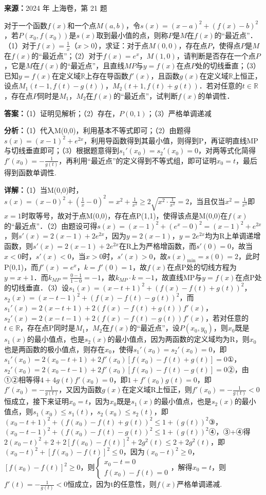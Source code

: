 \begin{question}[points=18]
\textbf{来源：}2024 年 上海卷，第 21 题\par
对于一个函数$f(x)$和一个点$M(a,b)$，令$s(x)=(x-a)^2+(f(x)-b)^2$，若$P(x_0,f(x_0))$是$s(x)$取到最小值的点，则称$P$是$M$在$f(x)$的“最近点”．（1）对于$f(x)=\frac1x$（$x>0$），求证：对于点$M(0,0)$，存在点$P$，使得点$P$是$M$在$f(x)$的“最近点”；（2）对于$f(x)=e^x$，$M(1,0)$，请判断是否存在一个点$P$，它是$M$在$f(x)$的“最近点”，且直线$MP$与$y=f(x)$在点$P$处的切线垂直；（3）已知$y=f(x)$在定义域$\mathbb{R}$上存在导函数$f'(x)$，且函数$g(x)$在定义域$\mathbb{R}$上恒正，设点$M_1(t-1,f(t)-g(t))$，$M_2(t+1,f(t)+g(t))$．若对任意的$t\in\mathbb{R}$，存在点$P$同时是$M_1$，$M_2$在$f(x)$的“最近点”，试判断$f(x)$的单调性．
\begin{solution}
\textbf{答案：}（1）证明见解析；（2）存在，$P(0,1)$；（3）严格单调递减

\textbf{分析：}（1）代入M(0,0)，利用基本不等式即可；（2）由题得$s(x)=(x-1)^2+e^{2x}$，利用导函数得到其最小值，则得到P，再证明直线MP与切线垂直即可；（3）根据题意得到$s_1'(x_0)=s_2'(x_0)=0$，对两等式化简得$f'(x_0)=-\frac1{g(t)}$，再利用“最近点”的定义得到不等式组，即可证明$x_0=t$，最后得到函数单调性.

\textbf{详解：}（1）当M(0,0)时，$s(x)=(x-0)^2+(\frac1x-0)^2=x^2+\frac1{x^2}\ge2\sqrt{x^2\cdot\frac1{x^2}}=2$，当且仅当$x^2=\frac1{x^2}$即$x=1$时取等号，故对于点M(0,0)，存在点P(1,1)，使得该点是M(0,0)在$f(x)$的“最近点”．（2）由题设可得$s(x)=(x-1)^2+(e^x-0)^2=(x-1)^2+e^{2x}$，则$s'(x)=2(x-1)+2e^{2x}$，因为$y=2(x-1)$，$y=2e^{2x}$均为R上单调递增函数，则$s'(x)=2(x-1)+2e^{2x}$在R上为严格增函数，而$s'(0)=0$，故当$x<0$时，$s'(x)<0$，当$x>0$时，$s'(x)>0$，故$s(x)_{\min}=s(0)=2$，此时P(0,1)，而$f'(x)=e^x$，$k=f'(0)=1$，故$f(x)$在点P处的切线方程为$y=x+1$．而$k_{MP}=\frac{0-1}{1-0}=-1$，故$k_{MP}\cdot k=-1$，故直线MP与$y=f(x)$在点P处的切线垂直．（3）设$s_1(x)=(x-t+1)^2+(f(x)-f(t)+g(t))^2$，$s_2(x)=(x-t-1)^2+(f(x)-f(t)-g(t))^2$，而$s_1'(x)=2(x-t+1)+2(f(x)-f(t)+g(t))f'(x)$，$s_2'(x)=2(x-t-1)+2(f(x)-f(t)-g(t))f'(x)$，若对任意的$t\in\mathbb{R}$，存在点P同时是$M_1$，$M_2$在$f(x)$的“最近点”，设$P(x_0,y_0)$，则$x_0$既是$s_1(x)$的最小值点，也是$s_2(x)$的最小值点，因为两函数的定义域均为R，则$x_0$也是两函数的极小值点，则存在$x_0$，使得$s_1'(x_0)=s_2'(x_0)=0$，即$s_1'(x_0)=2(x_0-t+1)+2f'(x_0)[f(x_0)-f(t)+g(t)]=0$①，$s_2'(x_0)=2(x_0-t-1)+2f'(x_0)[f(x_0)-f(t)-g(t)]=0$②，由①②相等得$4+4g(t)f'(x_0)=0$，即$1+f'(x_0)g(t)=0$，即$f'(x_0)=-\frac1{g(t)}$，又因为函数$g(x)$在定义域R上恒正，则$f'(x_0)=-\frac1{g(t)}<0$恒成立，接下来证明$x_0=t$，因为$x_0$既是$s_1(x)$的最小值点，也是$s_2(x)$的最小值点，则$s_1(x_0)\le s_1(t)$，$s_2(x_0)\le s_2(t)$，即$(x_0-t+1)^2+(f(x_0)-f(t)+g(t))^2\le1+(g(t))^2$③，$(x_0-t-1)^2+(f(x_0)-f(t)-g(t))^2\le1+(g(t))^2$④，③+④得$2(x_0-t)^2+2+2[f(x_0)-f(t)]^2+2g^2(t)\le2+2g^2(t)$，即$(x_0-t)^2+[f(x_0)-f(t)]^2\le0$，因为$(x_0-t)^2\ge0$，$[f(x_0)-f(t)]^2\ge0$，则$\begin{cases} x_0-t=0 \\ f(x_0)-f(t)=0 \end{cases}$，解得$x_0=t$，则$f'(t)=-\frac1{g(t)}<0$恒成立，因为t的任意性，则$f(x)$严格单调递减.
\end{solution}
\end{question}

